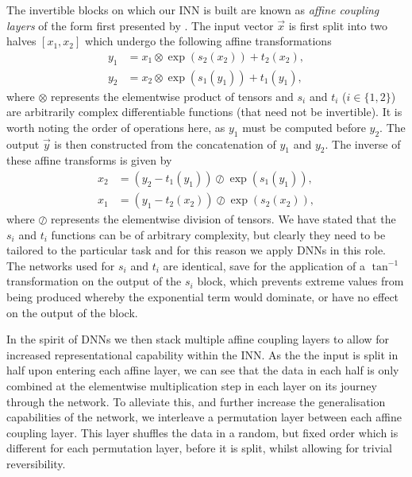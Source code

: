 The invertible blocks on which our INN is built are known as \emph{affine coupling layers} \citep{2014Dinh,2016Dinh} of the form first presented by \citet{2018Ardizzone}.
The input vector $\vec{x}$ is first split into two halves $[x_1, x_2]$ which undergo the following affine transformations
\begin{align}
    y_1 &= x_1 \otimes \exp(s_2(x_2)) + t_2(x_2),\\
    y_2 &= x_2 \otimes \exp(s_1(y_1)) + t_1(y_1),
\end{align}
where $\otimes$ represents the elementwise product of tensors and $s_i$ and $t_i$ ($i \in \{1, 2\}$) are arbitrarily complex differentiable functions (that need not be invertible).
It is worth noting the order of operations here, as $y_1$ must be computed before $y_2$.
The output $\vec{y}$ is then constructed from the concatenation of $y_1$ and $y_2$.
The inverse of these affine transforms is given by
\begin{align}
    x_2 &= (y_2 - t_1(y_1)) \oslash \exp(s_1(y_1)),\\
    x_1 &= (y_1 - t_2(x_2)) \oslash \exp(s_2(x_2)),
\end{align}
where $\oslash$ represents the elementwise division of tensors.
We have stated that the $s_i$ and $t_i$ functions can be of arbitrary complexity, but clearly they need to be tailored to the particular task and for this reason we apply DNNs in this role.
The networks used for $s_i$ and $t_i$ are identical, save for the application of a $\tan^{-1}$ transformation on the output of the $s_i$ block, which prevents extreme values from being produced whereby the exponential term would dominate, or have no effect on the output of the block.

In the spirit of DNNs we then stack multiple affine coupling layers to allow for increased representational capability within the INN.
As the the input is split in half upon entering each affine layer, we can see that the data in each half is only combined at the elementwise multiplication step in each layer on its journey through the network.
To alleviate this, and further increase the generalisation capabilities of the network, we interleave a permutation layer between each affine coupling layer.
This layer shuffles the data in a random, but fixed order which is different for each permutation layer, before it is split, whilst allowing for trivial reversibility.

